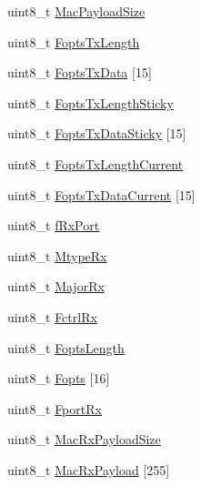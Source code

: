 \begin{DoxyCompactItemize}
\item 
uint8\+\_\+t \mbox{\hyperlink{class_lora_wan_container_a7a5629712138aea035101727cefe9932}{Mac\+Payload\+Size}}
\item 
uint8\+\_\+t \mbox{\hyperlink{class_lora_wan_container_ab30ac450a53d4591f9555e081c1e6f25}{Fopts\+Tx\+Length}}
\item 
uint8\+\_\+t \mbox{\hyperlink{class_lora_wan_container_aec4a26086022915f815f3ae0d03a8886}{Fopts\+Tx\+Data}} \mbox{[}15\mbox{]}
\item 
uint8\+\_\+t \mbox{\hyperlink{class_lora_wan_container_ac4263086bb1fcf19feb2fdeeeecac82c}{Fopts\+Tx\+Length\+Sticky}}
\item 
uint8\+\_\+t \mbox{\hyperlink{class_lora_wan_container_aad9ee7e5a686fea5aac63e7fd0b4d3b2}{Fopts\+Tx\+Data\+Sticky}} \mbox{[}15\mbox{]}
\item 
uint8\+\_\+t \mbox{\hyperlink{class_lora_wan_container_ac9cc778ff97f8fb9182d9b8a99f6d08b}{Fopts\+Tx\+Length\+Current}}
\item 
uint8\+\_\+t \mbox{\hyperlink{class_lora_wan_container_a55fd2a924f9e9c32a2567c4f6f8fe661}{Fopts\+Tx\+Data\+Current}} \mbox{[}15\mbox{]}
\item 
uint8\+\_\+t \mbox{\hyperlink{class_lora_wan_container_a2659e1c21772c4948ed6669e6b8c1773}{f\+Rx\+Port}}
\item 
uint8\+\_\+t \mbox{\hyperlink{class_lora_wan_container_af4899d6960d72697cdcba3471bb371c1}{Mtype\+Rx}}
\item 
uint8\+\_\+t \mbox{\hyperlink{class_lora_wan_container_a7098243d9141419c21369840c5852d3f}{Major\+Rx}}
\item 
uint8\+\_\+t \mbox{\hyperlink{class_lora_wan_container_adeacbc1d6a4a97256e0e35e9c72799f6}{Fctrl\+Rx}}
\item 
uint8\+\_\+t \mbox{\hyperlink{class_lora_wan_container_a89564c8c68d7f3067c804c2d1034cd48}{Fopts\+Length}}
\item 
uint8\+\_\+t \mbox{\hyperlink{class_lora_wan_container_a747eaf56824bd60202ffbd3126541e6a}{Fopts}} \mbox{[}16\mbox{]}
\item 
uint8\+\_\+t \mbox{\hyperlink{class_lora_wan_container_a90fd2bfb7df32ce225e2860c920e58d6}{Fport\+Rx}}
\item 
uint8\+\_\+t \mbox{\hyperlink{class_lora_wan_container_a481588e4fef130cf21d6be3a3812d776}{Mac\+Rx\+Payload\+Size}}
\item 
uint8\+\_\+t \mbox{\hyperlink{class_lora_wan_container_a1181f001c9b5ff0d95099e65c2a36f4d}{Mac\+Rx\+Payload}} \mbox{[}255\mbox{]}
\item 

\end{DoxyCompactItemize}
